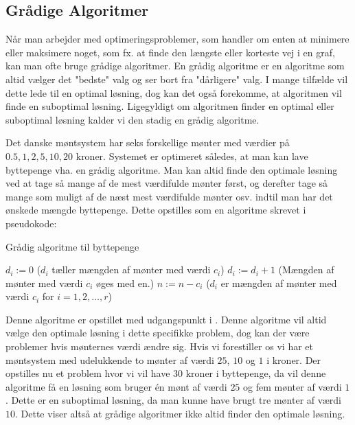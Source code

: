 \subsection{Grådige Algoritmer}
Når man arbejder med optimeringsproblemer, som handler om enten at minimere eller maksimere noget, som fx. at finde den længste eller korteste vej i en graf, kan man ofte bruge grådige algoritmer.
En grådig algoritme er en algoritme som altid vælger det "bedste" valg og ser bort fra "dårligere" valg. I mange tilfælde vil dette lede til en optimal løsning, dog kan det også forekomme, at algoritmen vil finde en suboptimal løsning. Ligegyldigt om algoritmen finder en optimal eller suboptimal løsning kalder vi den stadig en grådig algoritme.

\begin{exmp}
Det danske møntsystem har seks forskellige mønter med værdier på $0.5, 1, 2, 5, 10, 20$ kroner. Systemet er optimeret således, at man kan lave byttepenge vha. en grådig algoritme. Man kan altid finde den optimale løsning ved at tage så mange af de mest værdifulde mønter først, og derefter tage så mange som muligt af de næst mest værdifulde mønter osv. indtil man har det ønskede mængde byttepenge.
Dette opstilles som en algoritme skrevet i pseudokode:
\begin{algorithm} [H]
\caption{Grådig algoritme til byttepenge}
\begin{algorithmic}[1]

\EndProcedure
{}
    \State $d_i:=0$ ($d_i$ tæller mængden af mønter med værdi $c_i$)
    	\State $d_i := d_i+1$ (Mængden af mønter med værdi $c_i$ øges med en.)
    	\State $n := n-c_i$
\EndWhile
\EndFor
\State ($d_i$ er mængden af mønter med værdi $c_i$ for $i=1,2,\dotsc,r$)
\end{algorithmic}
\end{algorithm}
Denne algoritme er opstillet med udgangspunkt i \citep{dmat}. Denne algoritme vil altid vælge den optimale løsning i dette specifikke problem, dog kan der være problemer hvis mønternes værdi ændre sig. 
Hvis vi forestiller os vi har et møntsystem med udelukkende to mønter af værdi $25$, $10$ og $1$ i kroner. Der opstilles nu et problem hvor vi vil have $30$ kroner i byttepenge, da vil denne algoritme få en løsning som bruger én mønt af værdi $25$ og fem mønter af værdi $1$. Dette er en suboptimal løsning, da man kunne have brugt tre mønter af værdi $10$.
Dette viser altså at grådige algoritmer ikke altid finder den optimale løsning.
\end{exmp}
